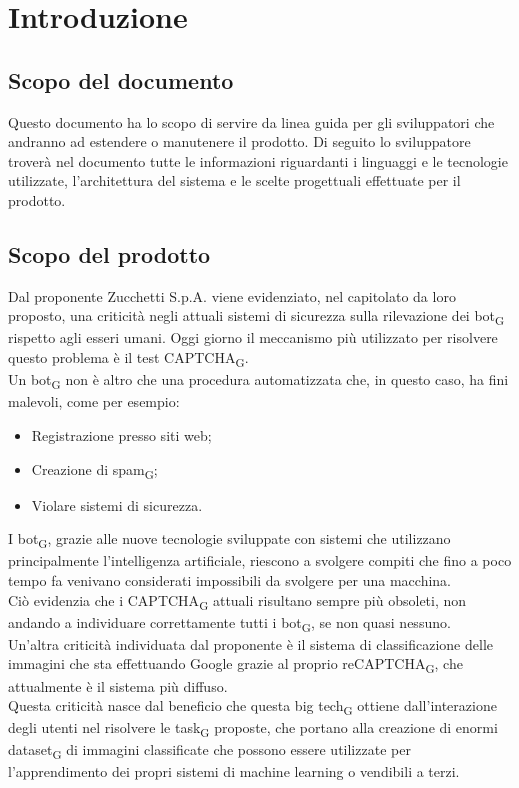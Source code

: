 \section{Introduzione}

\subsection{Scopo del documento}
Questo documento ha lo scopo di servire da linea guida per gli sviluppatori che andranno ad estendere o manutenere il prodotto. 
Di seguito lo sviluppatore troverà nel documento tutte le informazioni riguardanti i linguaggi e le tecnologie utilizzate, l’architettura del sistema e le scelte progettuali effettuate
per il prodotto.

\subsection{Scopo del prodotto}
Dal proponente Zucchetti S.p.A. viene evidenziato, nel capitolato da loro proposto, una criticità negli attuali sistemi di sicurezza sulla rilevazione dei bot\textsubscript{G} rispetto agli esseri umani. Oggi giorno il meccanismo più utilizzato per risolvere questo problema è il test CAPTCHA\textsubscript{G}.\\
Un bot\textsubscript{G} non è altro che una procedura automatizzata che, in questo caso, ha fini malevoli, come per esempio:
\begin{itemize}
	\item Registrazione presso siti web;
	\item Creazione di spam\textsubscript{G};
	\item Violare sistemi di sicurezza.
\end{itemize}
I bot\textsubscript{G}, grazie alle nuove tecnologie sviluppate con sistemi che utilizzano principalmente l'intelligenza artificiale, riescono a svolgere compiti che fino a poco tempo fa venivano considerati impossibili da svolgere per una macchina.\\
Ciò evidenzia che i CAPTCHA\textsubscript{G} attuali risultano sempre più obsoleti, non andando a individuare correttamente tutti i bot\textsubscript{G}, se non quasi nessuno.\\
Un'altra criticità individuata dal proponente è il sistema di classificazione delle immagini che sta effettuando Google grazie al proprio reCAPTCHA\textsubscript{G}, che attualmente è il sistema più diffuso.\\
Questa criticità nasce dal beneficio che questa big tech\textsubscript{G} ottiene dall'interazione degli utenti nel risolvere le task\textsubscript{G} proposte, che portano alla creazione di enormi dataset\textsubscript{G} di immagini classificate che possono essere utilizzate per l'apprendimento dei propri sistemi di machine learning o vendibili a terzi.\\
